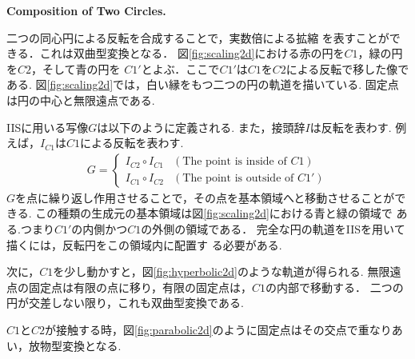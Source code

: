 \noindent\textbf{Composition of Two Circles.}

二つの同心円による反転を合成することで，実数倍による拡縮
を表すことができる．これは双曲型変換となる．
図\ref{fig:scaling2d}における赤の円を$C1$，緑の円を$C2$，そして青の円を
$C1'$とよぶ．ここで$C1'$は$C1$を$C2$による反転で移した像である.
図\ref{fig:scaling2d}では，白い縁をもつ二つの円の軌道を描いている.
固定点は円の中心と無限遠点である.

IISに用いる写像$G$は以下のように定義される.
また，接頭辞$I$は反転を表わす.
例えば，$I_{C1}$は$C1$による反転を表わす.
\begin{align*}
 G =
  \begin{cases}
   I_{C2} \circ I_{C1} & (\text{The point is inside of } C1) \\
   I_{C1} \circ I_{C2} & (\text{The point is outside of } C1')
  \end{cases}
\end{align*}
$G$を点に繰り返し作用させることで，その点を基本領域へと移動させることができる.
この種類の生成元の基本領域は図\ref{fig:scaling2d}における青と緑の領域で
ある.つまり$C1'$の内側かつ$C1$の外側の領域である．
完全な円の軌道をIISを用いて描くには，反転円をこの領域内に配置す
る必要がある.

次に，$C1$を少し動かすと，図\ref{fig:hyperbolic2d}のような軌道が得られる.
無限遠点の固定点は有限の点に移り，有限の固定点は，$C1$の内部で移動する．
二つの円が交差しない限り，これも双曲型変換である.

$C1$と$C2$が接触する時，図\ref{fig:parabolic2d}のように固定点はその交点で重なりあい，放物型変換となる.

